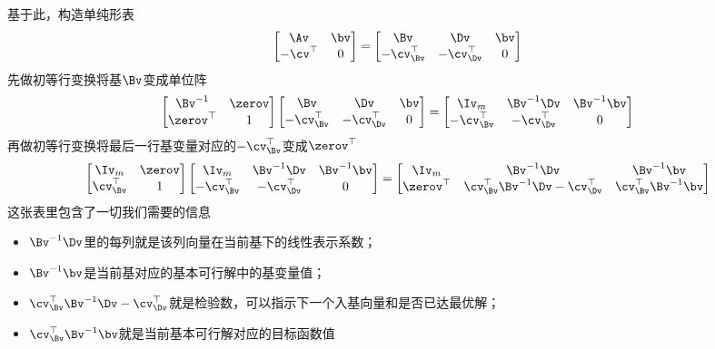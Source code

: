 \documentclass{ctexart}
\begin{document}
基于此，构造单纯形表
\begin{align*}
    \begin{bmatrix}
        \Av & \bv \\ -\cv^\top & 0
    \end{bmatrix} =
    \begin{bmatrix}
        \Bv & \Dv & \bv \\ -\cv_\Bv^\top & -\cv_\Dv^\top & 0
    \end{bmatrix}
\end{align*}
先做初等行变换将基$\Bv$变成单位阵
\begin{align*}
    \begin{bmatrix}
        \Bv^{-1} & \zerov \\ \zerov^\top & 1
    \end{bmatrix}
    \begin{bmatrix}
        \Bv & \Dv & \bv \\ -\cv_\Bv^\top & -\cv_\Dv^\top & 0
    \end{bmatrix} =
    \begin{bmatrix}
        \Iv_m & \Bv^{-1} \Dv & \Bv^{-1} \bv \\ -\cv_\Bv^\top & -\cv_\Dv^\top & 0
    \end{bmatrix}
\end{align*}
再做初等行变换将最后一行基变量对应的$-\cv_\Bv^\top$变成$\zerov^\top$
\begin{align*}
    \begin{bmatrix}
        \Iv_m & \zerov \\ \cv_\Bv^\top & 1
    \end{bmatrix}
    \begin{bmatrix}
        \Iv_m & \Bv^{-1} \Dv & \Bv^{-1} \bv \\ -\cv_\Bv^\top & -\cv_\Dv^\top & 0
    \end{bmatrix} =
    \begin{bmatrix}
        \Iv_m & \Bv^{-1} \Dv & \Bv^{-1} \bv \\ \zerov^\top & \cv_\Bv^\top \Bv^{-1} \Dv - \cv_\Dv^\top & \cv_\Bv^\top \Bv^{-1} \bv
    \end{bmatrix}
\end{align*}
这张表里包含了一切我们需要的信息
\begin{itemize}
    \item $\Bv^{-1} \Dv$里的每列就是该列向量在当前基下的线性表示系数；
    \item $\Bv^{-1} \bv$是当前基对应的基本可行解中的基变量值；
    \item $\cv_\Bv^\top \Bv^{-1} \Dv - \cv_\Dv^\top$就是检验数，可以指示下一个入基向量和是否已达最优解；
    \item $\cv_\Bv^\top \Bv^{-1} \bv$就是当前基本可行解对应的目标函数值
\end{itemize}
\end{document}
